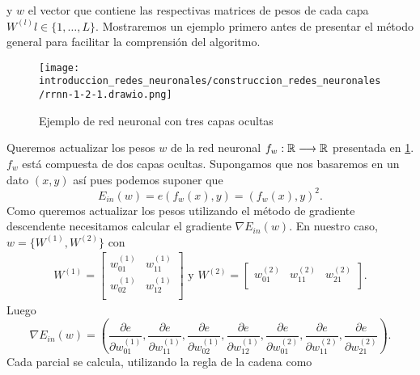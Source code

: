 y $w$ el vector que contiene las respectivas matrices de pesos de cada capa 
$W^{(l)} l \in \{1, \ldots, L\}.$  
Mostraremos un ejemplo primero antes de presentar el método general para facilitar la comprensión del algoritmo. 
\begin{figure}[h!]
    \texttt{[image: introduccion\_redes\_neuronales/construccion\_redes\_neuronales/rrnn-1-2-1.drawio.png]}
    \caption{Ejemplo de red neuronal con tres capas ocultas}
    \label{img:construccion_rrnn:rrnn-1-2-1}
\end{figure} 
Queremos actualizar los pesos $w$ de la red neuronal 
$f_w : \mathbb{R} \longrightarrow \mathbb{R}$ presentada en \ref{img:construccion_rrnn:rrnn-1-2-1}.
$f_w$ está compuesta de dos capas ocultas. Supongamos que nos basaremos en un dato 
$(x, y)$ así pues podemos suponer que 
\begin{equation}
    E_{in}(w) = e(f_w(x), y) = (f_w(x), y)^2.
\end{equation}
Como queremos actualizar los pesos utilizando el método de gradiente descendente necesitamos calcular el gradiente $\nabla E_{in}(w)$. 
En nuestro caso, $w=\{W^{(1)}, W^{(2)}\}$ con 
\begin{align}
    W^{(1)} = 
    \begin{bmatrix}
        w^{(1)}_{01} & w^{(1)}_{11} \\
        w^{(1)}_{02} & w^{(1)}_{12} \\
    \end{bmatrix} 
    \text{ y }
    W^{(2)} = 
    \begin{bmatrix}
        w^{(2)}_{01} & w^{(2)}_{11} & w^{(2)}_{21}\\
    \end{bmatrix}. 
\end{align}
Luego 
\begin{equation}
    \nabla E_{in}(w) = 
    \left(
        \frac{\partial e}{\partial w^{(1)}_{01}},
        \frac{\partial e}{\partial w^{(1)}_{11}},
        \frac{\partial e}{\partial w^{(1)}_{02}},
        \frac{\partial e}{\partial w^{(1)}_{12}},
        \frac{\partial e}{\partial w^{(2)}_{01}},
        \frac{\partial e}{\partial w^{(2)}_{11}},
        \frac{\partial e}{\partial w^{(2)}_{21}}
    \right).
\end{equation} 
Cada parcial se calcula, utilizando la regla de la cadena como
